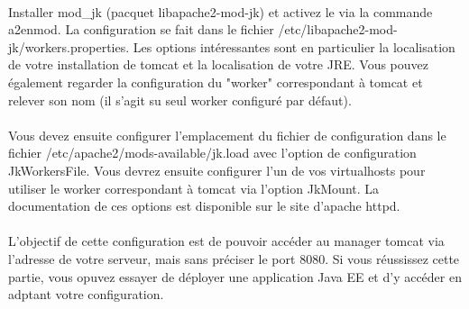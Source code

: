 \documentclass[12pt,a4paper]{article}
\begin{document}
\paragraph{}
Installer mod\_jk (pacquet libapache2-mod-jk) et activez le via la commande a2enmod. La configuration se fait dans le fichier /etc/libapache2-mod-jk/workers.properties. Les options intéressantes sont en particulier la localisation de votre installation de tomcat et la localisation de votre JRE. Vous pouvez également regarder la configuration du "worker" correspondant à tomcat et relever son nom (il s'agit su seul worker configuré par défaut).

\paragraph{}
Vous devez ensuite configurer l'emplacement du fichier de configuration dans le fichier /etc/apache2/mods-available/jk.load avec l'option de configuration JkWorkersFile. Vous devrez ensuite configurer l'un de vos virtualhosts pour utiliser le worker correspondant à tomcat via l'option JkMount. La documentation de ces options est disponible sur le site d'apache httpd.

\paragraph{}
L'objectif de cette configuration est de pouvoir accéder au manager tomcat via l'adresse de votre serveur, mais sans préciser le port 8080. Si vous réussissez cette partie, vous opuvez essayer de déployer une application Java EE et d'y accéder en adptant votre configuration.
\end{document}
